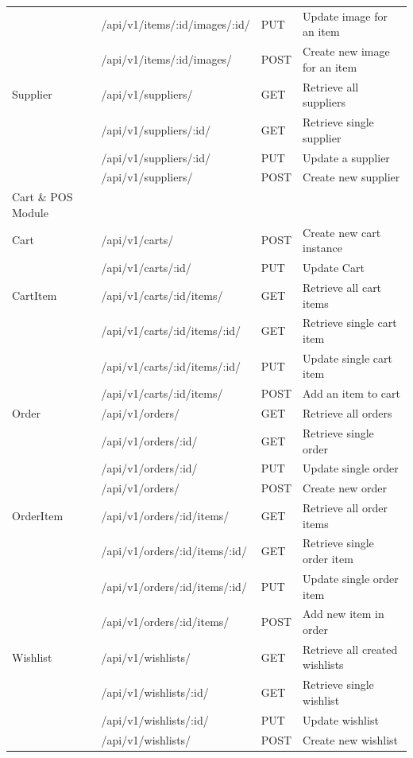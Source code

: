 \documentclass{report}
\begin{document}
\begin{table}[ht]
{\begin{tabular}{llll}
							& /api/v1/items/:id/images/:id/ & PUT & Update image for an item \\
							& /api/v1/items/:id/images/ & POST & Create new image for an item \\ \hline
Supplier				& /api/v1/suppliers/ & GET & Retrieve all suppliers \\ 
							& /api/v1/suppliers/:id/ & GET & Retrieve single supplier \\ 
							& /api/v1/suppliers/:id/ & PUT & Update a supplier \\ 
							& /api/v1/suppliers/	& POST & Create new supplier \\ \hline
Cart \& POS Module  \\ \hline
Cart 						& /api/v1/carts/			& POST & Create new cart instance  \\ 
							& /api/v1/carts/:id/ 	& PUT &  Update Cart  \\ \hline
CartItem				& /api/v1/carts/:id/items/ & GET & Retrieve all cart items \\ 
							& /api/v1/carts/:id/items/:id/ & GET & Retrieve single cart item \\
							& /api/v1/carts/:id/items/:id/ & PUT & Update single cart item \\
							& /api/v1/carts/:id/items/ & POST & Add an item to cart \\ \hline
Order					& /api/v1/orders/ & GET & Retrieve all orders \\ 
							& /api/v1/orders/:id/ & GET & Retrieve single order \\ 
							& /api/v1/orders/:id/ & PUT & Update single order \\ 
							& /api/v1/orders/ & POST & Create new order \\ \hline
OrderItem				& /api/v1/orders/:id/items/ & GET & Retrieve all order items \\ 
							& /api/v1/orders/:id/items/:id/ & GET & Retrieve single order item \\ 
							& /api/v1/orders/:id/items/:id/ & PUT & Update single order item \\
							& /api/v1/orders/:id/items/ & POST & Add new item in order \\ \hline
Wishlist 				& /api/v1/wishlists/ & GET & Retrieve all created wishlists \\ 
							& /api/v1/wishlists/:id/ & GET & Retrieve single wishlist \\ 
							& /api/v1/wishlists/:id/ & PUT & Update wishlist \\ 
							& /api/v1/wishlists/ & POST & Create new wishlist \\ \hline

\end{tabular}}
\end{table}
\end{document}
